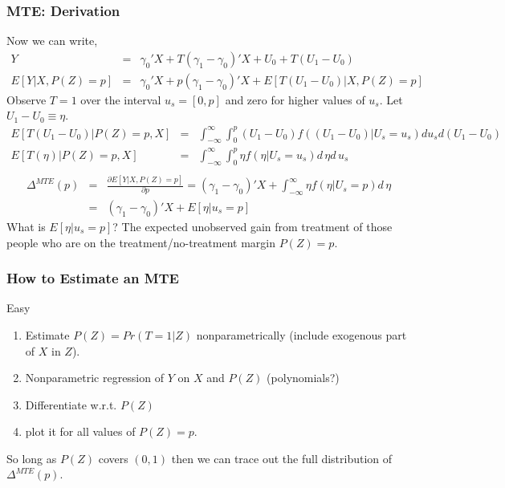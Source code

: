 \begin{frame}
\frametitle{MTE: Derivation}
\footnotesize
Now we can write,
\begin{eqnarray*}
Y &=& \gamma_0' X + T(\gamma_1 - \gamma_0)' X + U_0 + T(U_1 - U_0)\\
E[Y| X,P(Z)=p] &=& \gamma_0' X + p(\gamma_1 - \gamma_0)'X + E[T(U_1 - U_0)|X,P(Z)=p]
\end{eqnarray*}
Observe $T=1$ over the interval $u_s = [0,p]$ and zero for higher values of $u_s$. Let $U_1-U_0 \equiv \eta$.
\begin{eqnarray*}
E[T(U_1 - U_0) | P(Z) =p,X] &=& \int_{-\infty}^{\infty} \int_{0}^{p} (U_1 - U_0) f((U_1-U_0) | U_s = u_s) d u_s d(U_1 -U_0)\\
E[T(\eta) | P(Z) =p,X] &=& \int_{-\infty}^{\infty} \int_{0}^{p} \eta f(\eta | U_s = u_s)  d\, \eta d\, u_s\\
\end{eqnarray*}
\begin{eqnarray*}
\Delta^{MTE}(p) &=& \frac{\partial E[Y | X, P(Z)=p]}{\partial p} = (\gamma_1 - \gamma_0)'X + \int_{-\infty}^{\infty} \eta f(\eta | U_s =p) d\, \eta\\
&=& (\gamma_1 - \gamma_0)'X + E[\eta | u_s =p]
\end{eqnarray*}
What is $E[\eta | u_s =p]$? The expected unobserved gain from treatment of those people who are on the treatment/no-treatment margin $P(Z)=p$.
\end{frame}

\begin{frame}
\frametitle{How to Estimate an MTE}
Easy
\begin{enumerate}
\item Estimate $P(Z) = Pr(T=1 | Z)$ nonparametrically (include exogenous part of $X$ in $Z$).
\item Nonparametric regression of $Y$ on $X$ and $P(Z)$ (polynomials?)
\item Differentiate w.r.t. $P(Z)$
\item plot it for all values of $P(Z)=p$.
\end{enumerate}
So long as $P(Z)$ covers $(0,1)$ then we can trace out the full distribution of $\Delta^{MTE}(p)$.
\end{frame}



